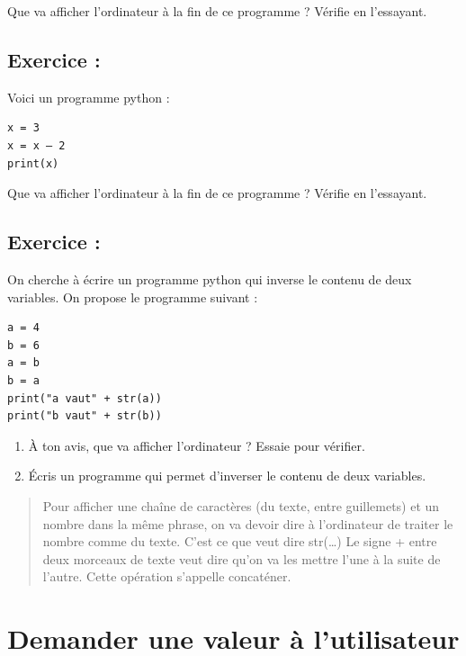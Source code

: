 \documentclass[a4paper,french,11pt]{article}
\providecommand{\tightlist}{%
  \setlength{\itemsep}{0pt}\setlength{\parskip}{0pt}}
\begin{document}
Que va afficher l'ordinateur à la fin de ce programme ? Vérifie en
l'essayant.

\hypertarget{exercice-2}{%
\subsection{Exercice :}\label{exercice-2}}

Voici un programme python :

\begin{verbatim}
x = 3
x = x – 2
print(x)
\end{verbatim}

Que va afficher l'ordinateur à la fin de ce programme ? Vérifie en
l'essayant.

\hypertarget{exercice-3}{%
\subsection{Exercice :}\label{exercice-3}}

On cherche à écrire un programme python qui inverse le contenu de deux
variables. On propose le programme suivant :

\begin{verbatim}
a = 4
b = 6
a = b
b = a
print("a vaut" + str(a))
print("b vaut" + str(b))
\end{verbatim}

\begin{enumerate}
\def\labelenumi{\arabic{enumi}.}
\tightlist
\item
  À ton avis, que va afficher l'ordinateur ? Essaie pour vérifier.
\item
  Écris un programme qui permet d'inverser le contenu de deux variables.
\end{enumerate}

\begin{quote}
Pour afficher une chaîne de caractères (du texte, entre guillemets) et
un nombre dans la même phrase, on va devoir dire à l'ordinateur de
traiter le nombre comme du texte. C'est ce que veut dire str(\ldots{})
Le signe + entre deux morceaux de texte veut dire qu'on va les mettre
l'une à la suite de l'autre. Cette opération s'appelle concaténer.
\end{quote}

\hypertarget{demander-une-valeur-uxe0-lutilisateur}{%
\section{Demander une valeur à
l'utilisateur}\label{demander-une-valeur-uxe0-lutilisateur}}
\end{document}
